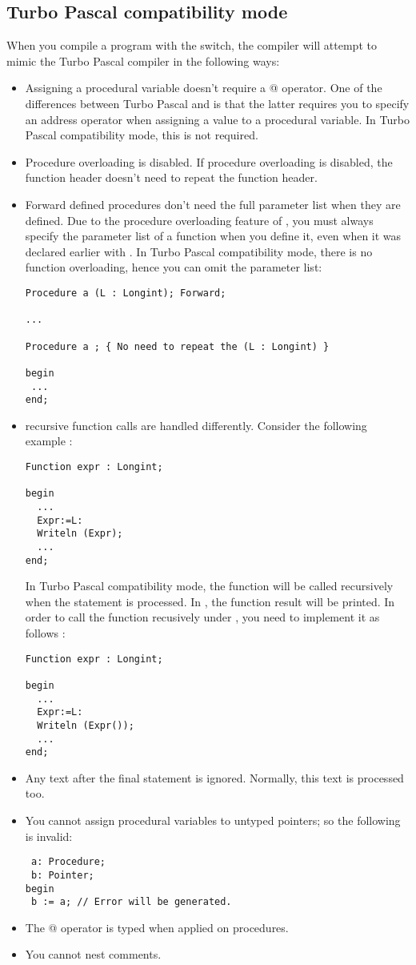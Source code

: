 \subsection{Turbo Pascal compatibility mode}
When you compile a program with the  switch, the compiler will
attempt to mimic the Turbo Pascal compiler in the following ways:
\begin{itemize}
\item Assigning a procedural variable doesn't require a @ operator. One of
the differences between Turbo Pascal and \fpc is that the latter requires
you to specify an address operator when assigning a value to a procedural
variable. In Turbo Pascal compatibility mode, this is not required.
\item Procedure overloading is disabled. If procedure overloading is
disabled, the function header doesn't need to repeat the function header.

\item Forward defined procedures don't need the full parameter list when
they are defined. Due to the procedure overloading feature of \fpc, you must
always specify the parameter list of a function when you define it, even
when it was declared earlier with . In Turbo Pascal
compatibility mode, there is no function overloading, hence you can omit the
parameter list:
\begin{verbatim}
Procedure a (L : Longint); Forward;

...

Procedure a ; { No need to repeat the (L : Longint) }

begin
 ...
end;

\end{verbatim}
\item recursive function calls are handled differently. Consider the
following example :
\begin{verbatim}
Function expr : Longint;

begin
  ...
  Expr:=L:
  Writeln (Expr);
  ...
end;
\end{verbatim}
In Turbo Pascal compatibility mode, the function will be called recursively
when the  statement is processed. In \fpc, the function result
will be printed. In order to call the function recusively under \fpc, you
need to implement it as follows :
\begin{verbatim}
Function expr : Longint;

begin
  ...
  Expr:=L:
  Writeln (Expr());
  ...
end;
\end{verbatim}
\item Any text after the final  statement is ignored. Normally,
this text is processed too.
\item You cannot assign procedural variables to untyped pointers; so the
following is invalid:
\begin{verbatim}
 a: Procedure;
 b: Pointer;
begin
 b := a; // Error will be generated.
\end{verbatim}
\item The @ operator is typed when applied on procedures.
\item You cannot nest comments.
\end{itemize}

